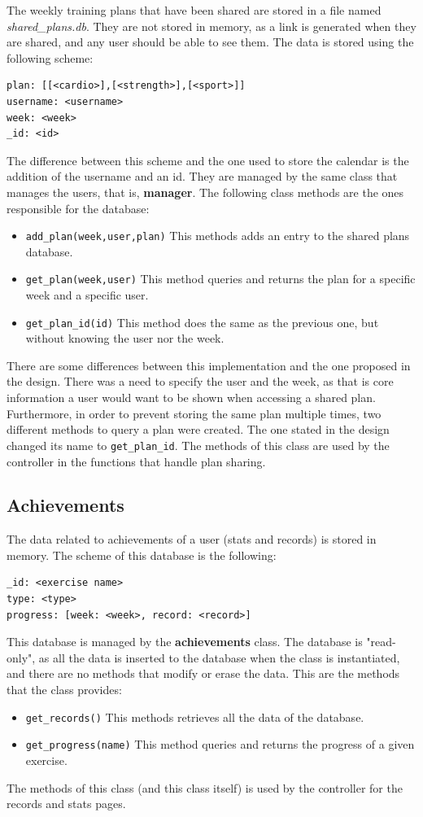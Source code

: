 \documentclass[12pt,twoside,titlepage,a4paper]{article}
\theoremstyle{definicion}
\theoremstyle{lema}
\theoremstyle{teorema}
\theoremstyle{corolario}
\theoremstyle{ejemplo}
\theoremstyle{nota}
\begin{document}
The weekly training plans that have been shared are stored in a file named \textit{shared\_plans.db}. They are not stored in memory,
as a link is generated when they are shared, and any user should be able to see them. The data is stored using the following scheme:
\begin{lstlisting}
plan: [[<cardio>],[<strength>],[<sport>]]
username: <username>
week: <week>
_id: <id>
\end{lstlisting}
The difference between this scheme and the one used to store the calendar is the addition of the username and an id. They are managed
by the same class that manages the users, that is, \textbf{manager}. The following class methods are the ones responsible for the 
database:
\begin{itemize} [noitemsep]
	\item \texttt{add\_plan(week,user,plan)} This methods adds an entry to the shared plans database.
	\item \texttt{get\_plan(week,user)} This method queries and returns the plan for a specific week and a specific user.
	\item \texttt{get\_plan\_id(id)} This method does the same as the previous one, but without knowing the user nor the week.
\end{itemize}
There are some differences between this implementation and the one proposed in the design. There was a need to specify the user
and the week, as that is core information a user would want to be shown when accessing a shared plan. Furthermore, in order to
prevent storing the same plan multiple times, two different methods to query a plan were created. The one stated in the design
changed its name to \texttt{get\_plan\_id}. The methods of this class are used by the controller in the functions that handle
plan sharing.

\subsection{Achievements}

The data related to achievements of a user (stats and records) is stored in memory. The scheme of this database is the following:
\begin{lstlisting}
_id: <exercise name>
type: <type>
progress: [week: <week>, record: <record>]
\end{lstlisting}
This database is managed by the \textbf{achievements} class. The database is "read-only", as all the data is inserted to the database
when the class is instantiated, and there are no methods that modify or erase the data. This are the methods that the class provides:
\begin{itemize} [noitemsep]
	\item \texttt{get\_records()} This methods retrieves all the data of the database.
	\item \texttt{get\_progress(name)} This method queries and returns the progress of a given exercise.
\end{itemize}
The methods of this class (and this class itself) is used by the controller for the records and stats pages.
\newpage
\end{document}
